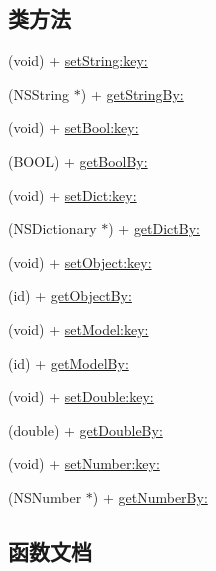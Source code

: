 \subsection*{类方法}
\begin{DoxyCompactItemize}
\item 
(void) + \hyperlink{interface_m_a_r_user_default_a1ac6ff1218023fa06df4261fefc5d720}{set\+String\+:key\+:}
\item 
(N\+S\+String $\ast$) + \hyperlink{interface_m_a_r_user_default_a9f4184bf40a9a449ce82bbbd6477cca6}{get\+String\+By\+:}
\item 
(void) + \hyperlink{interface_m_a_r_user_default_aabf46f58a109f903ccd3702cb843fac8}{set\+Bool\+:key\+:}
\item 
(B\+O\+OL) + \hyperlink{interface_m_a_r_user_default_aa40e6f25da80db0f68975d72b320e6c5}{get\+Bool\+By\+:}
\item 
(void) + \hyperlink{interface_m_a_r_user_default_a4d1d33a5a21d4bb0d5f835d97095bbbe}{set\+Dict\+:key\+:}
\item 
(N\+S\+Dictionary $\ast$) + \hyperlink{interface_m_a_r_user_default_aab5f0845c08e3894e16376898cb113f9}{get\+Dict\+By\+:}
\item 
(void) + \hyperlink{interface_m_a_r_user_default_a586b85683888187dde10395c3f7039ae}{set\+Object\+:key\+:}
\item 
(id) + \hyperlink{interface_m_a_r_user_default_a5e9ca56e96f14589842bb2a7d0f7e9d5}{get\+Object\+By\+:}
\item 
(void) + \hyperlink{interface_m_a_r_user_default_a0f9cb3ecc37e4d521eb9021863485add}{set\+Model\+:key\+:}
\item 
(id) + \hyperlink{interface_m_a_r_user_default_a61f5e543352e591d192a75597b23e110}{get\+Model\+By\+:}
\item 
(void) + \hyperlink{interface_m_a_r_user_default_af961401b81cbd3bd3401673871866243}{set\+Double\+:key\+:}
\item 
(double) + \hyperlink{interface_m_a_r_user_default_af8675eae621543dc4e5de1fe07b1efb9}{get\+Double\+By\+:}
\item 
(void) + \hyperlink{interface_m_a_r_user_default_ad7ec60ee4075a54c47cad51b9820781a}{set\+Number\+:key\+:}
\item 
(N\+S\+Number $\ast$) + \hyperlink{interface_m_a_r_user_default_a0d969febd802ba2f22947c442b739e82}{get\+Number\+By\+:}
\end{DoxyCompactItemize}


\subsection{函数文档}
\mbox{\label{interface_m_a_r_user_default_aa40e6f25da80db0f68975d72b320e6c5}} 
